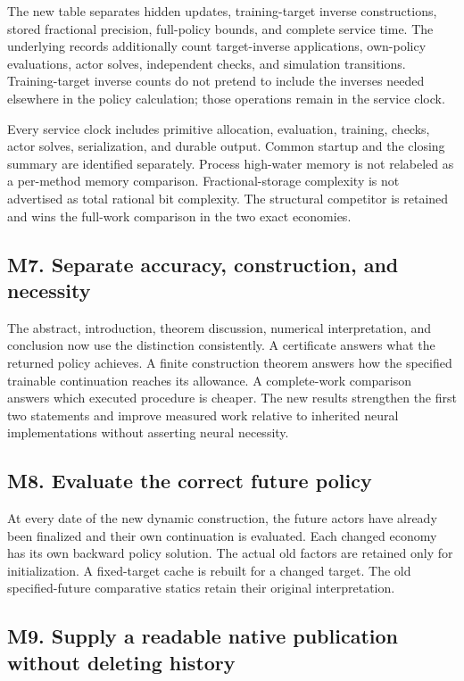 \documentclass[ecta,nameyear,draft]{econsocart}
\theoremstyle{definition}
\theoremstyle{remark}
\begin{document}
The new table separates hidden updates, training-target inverse constructions, stored fractional precision, full-policy bounds, and complete service time. The underlying records additionally count target-inverse applications, own-policy evaluations, actor solves, independent checks, and simulation transitions. Training-target inverse counts do not pretend to include the inverses needed elsewhere in the policy calculation; those operations remain in the service clock.

Every service clock includes primitive allocation, evaluation, training, checks, actor solves, serialization, and durable output. Common startup and the closing summary are identified separately. Process high-water memory is not relabeled as a per-method memory comparison. Fractional-storage complexity is not advertised as total rational bit complexity. The structural competitor is retained and wins the full-work comparison in the two exact economies.

\subsection*{M7. Separate accuracy, construction, and necessity}

The abstract, introduction, theorem discussion, numerical interpretation, and conclusion now use the distinction consistently. A certificate answers what the returned policy achieves. A finite construction theorem answers how the specified trainable continuation reaches its allowance. A complete-work comparison answers which executed procedure is cheaper. The new results strengthen the first two statements and improve measured work relative to inherited neural implementations without asserting neural necessity.

\subsection*{M8. Evaluate the correct future policy}

At every date of the new dynamic construction, the future actors have already been finalized and their own continuation is evaluated. Each changed economy has its own backward policy solution. The actual old factors are retained only for initialization. A fixed-target cache is rebuilt for a changed target. The old specified-future comparative statics retain their original interpretation.

\subsection*{M9. Supply a readable native publication without deleting history}
\end{document}
